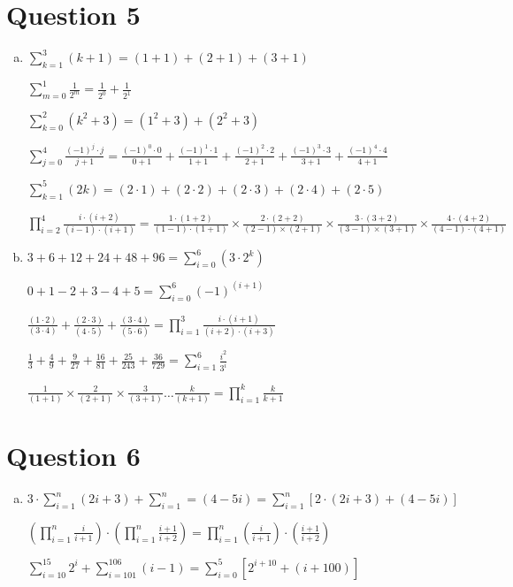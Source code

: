 \documentclass[12pt]{article}
\begin{document}
\section*{Question 5}

\begin{enumerate}[a)]
    \item
        $\sum\limits_{k=1}^3 (k + 1) = (1 + 1) + (2 + 1) + (3 + 1)$

        $\sum\limits_{m=0}^1 \frac{1}{2^m} = \frac{1}{2^0} + \frac{1}{2^1}$

        $\sum\limits_{k=0}^2 (k^2 + 3) = (1^2 + 3) + (2^2 + 3)$

        $\sum\limits_{j=0}^4 \frac{(-1)^j \cdot j}{j + 1} = \frac{(-1)^0 \cdot 0}{0 + 1} + \frac{(-1)^1 \cdot 1}{1 + 1} + \frac{(-1)^2 \cdot 2}{2 + 1} + \frac{(-1)^3  \cdot 3}{3 + 1} + \frac{(-1)^4 \cdot 4}{4 + 1}$

        $\sum\limits_{k=1}^5 (2k) = (2 \cdot 1) + (2 \cdot 2) + (2 \cdot 3) + (2 \cdot 4) + (2 \cdot 5)$

        $\prod\limits_{i=2}^4 \frac{i \cdot (i + 2)}{(i - 1) \cdot (i + 1)} = \frac{1 \cdot (1 + 2)}{(1 - 1) \cdot (1 + 1)} \times \frac{2 \cdot (2 + 2)}{(2 - 1) \times (2 + 1)} \times \frac{3 \cdot (3 + 2)}{(3 - 1) \times (3 + 1)} \times \frac{4 \cdot (4 + 2)}{(4 - 1) \cdot (4 + 1)}$
    \bigskip

    \item

        $3 + 6 + 12 + 24 + 48 + 96 = \sum\limits_{i=0}^6 (3 \cdot 2^k)$

        $0 + 1 - 2 + 3 - 4 + 5 = \sum\limits_{i=0}^6 (-1)^(i+1)$

        $\frac{(1 \cdot 2)}{(3 \cdot 4)} + \frac{(2 \cdot 3)}{(4 \cdot 5)} + \frac{(3 \cdot 4)}{(5 \cdot 6)} = \prod\limits_{i=1}^3 \frac{i \cdot (i + 1)}{(i + 2) \cdot (i + 3)}$

        $\frac{1}{3} + \frac{4}{9} + \frac{9}{27} + \frac{16}{81} + \frac{25}{243} + \frac{36}{729} = \sum\limits_{i=1}^6 \frac{i^2}{3^i}$

        $\frac{1}{(1 + 1)} \times \frac{2}{(2 + 1)} \times \frac{3}{(3 + 1)} \dots \frac{k}{(k + 1)} = \prod\limits_{i=1}^k \frac{k}{k + 1}$

\end{enumerate}

\section*{Question 6}

\begin{enumerate}[a)]
    \item
        $3 \cdot \sum\limits_{i=1}^n (2i + 3) + \sum\limits_{i=1}^n = (4 - 5i) = \sum\limits_{i=1}^n [2 \cdot (2i + 3) + (4 - 5i)]$

        $(\prod\limits_{i=1}^n \frac{i}{i + 1}) \cdot (\prod\limits_{i=1}^n \frac{i + 1}{i + 2}) = \prod\limits_{i=1}^n (\frac{i}{i + 1}) \cdot (\frac{i + 1}{i + 2})$

        $\sum\limits_{i=10}^{15} 2^i +\sum\limits_{i=101}^{106} (i -1) = \sum\limits_{i=0}^5 [2^{i + 10} + (i + 100)]$

\end{enumerate}
\end{document}
